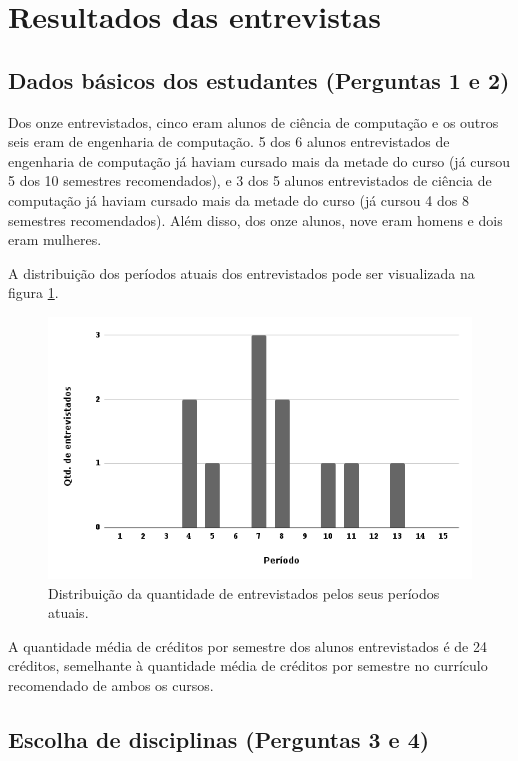 \section{Resultados das entrevistas}

\subsection{Dados básicos dos estudantes (Perguntas 1 e 2)}

Dos onze entrevistados, cinco eram alunos de ciência de computação e os outros seis eram de engenharia de computação. 5 dos 6 alunos entrevistados de engenharia de computação já haviam cursado mais da metade do curso (já cursou 5 dos 10 semestres recomendados), e 3 dos 5 alunos entrevistados de ciência de computação já haviam cursado mais da metade do curso (já cursou 4 dos 8 semestres recomendados). Além disso, dos onze alunos, nove eram homens e dois eram mulheres.

A distribuição dos períodos atuais dos entrevistados pode ser visualizada na figura \ref{fig:entrevista-grafico}. 

\begin{figure}[!ht]
    \begin{center}
    \includegraphics[width=350pt]{figuras/grafico-entrevista}
    \caption{Distribuição da quantidade de entrevistados pelos seus períodos atuais.}
    \label{fig:entrevista-grafico}
    \end{center}
  \end{figure}
  
A quantidade média de créditos por semestre dos alunos entrevistados é de 24 créditos, semelhante à quantidade média de créditos por semestre no currículo recomendado de ambos os cursos.

\subsection{Escolha de disciplinas (Perguntas 3 e 4)}
\label{sec:escolha-disciplinas}

